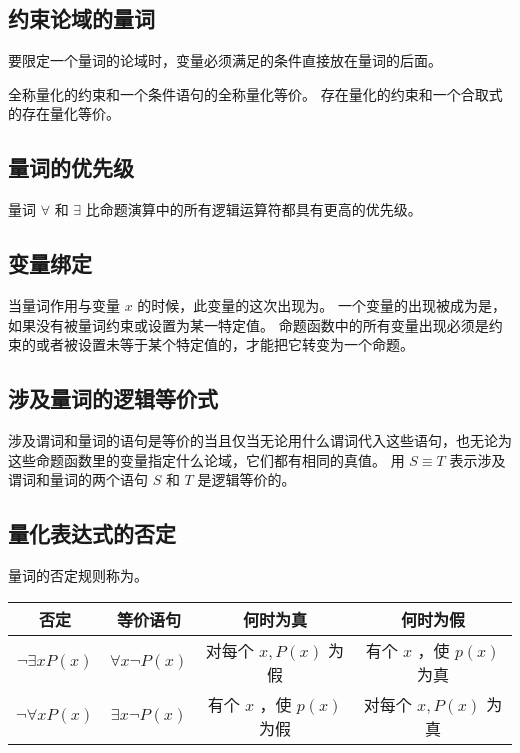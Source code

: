 {    \subsection{约束论域的量词}
    {
        要限定一个量词的论域时，变量必须满足的条件直接放在量词的后面。

        全称量化的约束和一个条件语句的全称量化等价。
        存在量化的约束和一个合取式的存在量化等价。
    }

    \subsection{量词的优先级}
    {
        量词 $\forall$ 和 $\exists$ 比命题演算中的所有逻辑运算符都具有更高的优先级。
    }

    \subsection{变量绑定}
    {
        当量词作用与变量 $x$ 的时候，此变量的这次出现为。
        一个变量的出现被成为是，如果没有被量词约束或设置为某一特定值。
        命题函数中的所有变量出现必须是约束的或者被设置未等于某个特定值的，才能把它转变为一个命题。
    }

    \subsection{涉及量词的逻辑等价式}
    {
        \begin{defines}
            涉及谓词和量词的语句是等价的当且仅当无论用什么谓词代入这些语句，也无论为这些命题函数里的变量指定什么论域，它们都有相同的真值。
            用 $S \equiv T$ 表示涉及谓词和量词的两个语句 $S$ 和 $T$ 是逻辑等价的。
        \end{defines}
    }

    \subsection{量化表达式的否定}
    {
        量词的否定规则称为。

        \begin{table}[htb]
            \centering

            \begin{tabular}{c|c|c|c}
                \hline
                否定 & 等价语句 & 何时为真 & 何时为假 \\
                \hline
                $\neg \exists xP(x)$ & $\forall x \neg P(x)$ & 对每个 $x, P(x)$ 为假 & 有个 $x$ ，使 $p(x)$ 为真 \\
                $\neg \forall xP(x)$ & $\exists x \neg P(x)$ & 有个 $x$ ，使 $p(x)$ 为假 & 对每个 $x, P(x)$ 为真 \\
                \hline
            \end{tabular}
        \end{table}
    }

}
